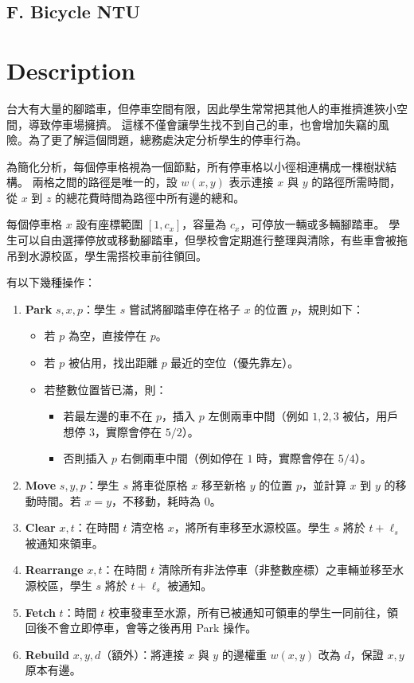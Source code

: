 \documentclass[11pt,a4paper]{article}
\begin{document}
\begin{center}
\section*{F. Bicycle NTU}
\end{center}

\section*{Description}


台大有大量的腳踏車，但停車空間有限，因此學生常常把其他人的車推擠進狹小空間，導致停車場擁擠。
這樣不僅會讓學生找不到自己的車，也會增加失竊的風險。為了更了解這個問題，總務處決定分析學生的停車行為。

為簡化分析，每個停車格視為一個節點，所有停車格以小徑相連構成一棵樹狀結構。
兩格之間的路徑是唯一的，設 $w(x, y)$ 表示連接 $x$ 與 $y$ 的路徑所需時間，
從 $x$ 到 $z$ 的總花費時間為路徑中所有邊的總和。

每個停車格 $x$ 設有座標範圍 $[1, c_x]$，容量為 $c_x$，可停放一輛或多輛腳踏車。
學生可以自由選擇停放或移動腳踏車，但學校會定期進行整理與清除，有些車會被拖吊到水源校區，學生需搭校車前往領回。

有以下幾種操作：

\begin{enumerate}
\item \textbf{Park} $s, x, p$：學生 $s$ 嘗試將腳踏車停在格子 $x$ 的位置 $p$，規則如下：
\begin{itemize}
\item 若 $p$ 為空，直接停在 $p$。
\item 若 $p$ 被佔用，找出距離 $p$ 最近的空位（優先靠左）。
\item 若整數位置皆已滿，則：
\begin{itemize}
\item 若最左邊的車不在 $p$，插入 $p$ 左側兩車中間（例如 $1, 2, 3$ 被佔，用戶想停 $3$，實際會停在 $5/2$）。
\item 否則插入 $p$ 右側兩車中間（例如停在 $1$ 時，實際會停在 $5/4$）。
\end{itemize}
\end{itemize}

\item \textbf{Move} $s, y, p$：學生 $s$ 將車從原格 $x$ 移至新格 $y$ 的位置 $p$，並計算 $x$ 到 $y$ 的移動時間。若 $x = y$，不移動，耗時為 0。

\item \textbf{Clear} $x, t$：在時間 $t$ 清空格 $x$，將所有車移至水源校區。學生 $s$ 將於 $t + \ell_s$ 被通知來領車。

\item \textbf{Rearrange} $x, t$：在時間 $t$ 清除所有非法停車（非整數座標）之車輛並移至水源校區，學生 $s$ 將於 $t + \ell_s$ 被通知。

\item \textbf{Fetch} $t$：時間 $t$ 校車發車至水源，所有已被通知可領車的學生一同前往，領回後不會立即停車，會等之後再用 Park 操作。

\item \textbf{Rebuild} $x, y, d$（額外）：將連接 $x$ 與 $y$ 的邊權重 $w(x, y)$ 改為 $d$，保證 $x, y$ 原本有邊。
\end{enumerate}
\end{document}
